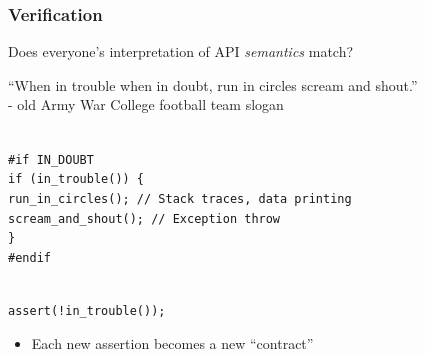 \documentclass[mathserif]{beamer}
\begin{document}
\begin{frame}
\frametitle{Verification}

    Does everyone's interpretation of API {\emph{semantics}} match?

\pause

\vfill

``When in trouble when in doubt, run in circles scream and shout.''\\
- old Army War College football team slogan

\pause

{\texttt{
\\
\#if IN\_DOUBT \\
\quad if (in\_trouble()) \{ \\
\quad\quad  run\_in\_circles(); // Stack traces, data printing \\
\quad\quad  scream\_and\_shout(); // Exception throw \\
\quad \} \\
\#endif
}}

\pause

{\texttt{
\\
assert(!in\_trouble());
}}

\pause

\begin{itemize}
\item Each new assertion becomes a new ``contract''
\end{itemize}

\end{frame}
\end{document}
